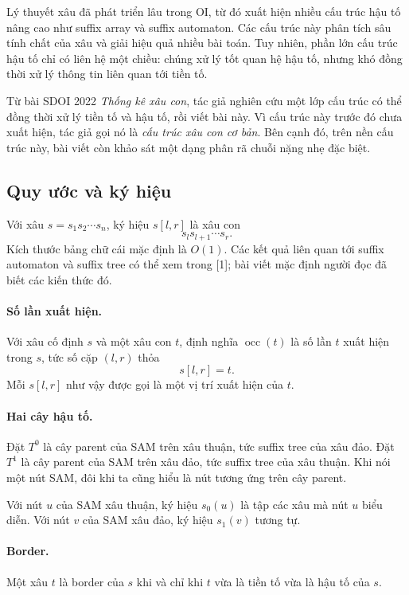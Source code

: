 \documentclass[11pt]{article}
\begin{document}
Lý thuyết xâu đã phát triển lâu trong OI, từ đó xuất hiện nhiều cấu trúc hậu
tố nâng cao như suffix array và suffix automaton. Các cấu trúc này phân tích
sâu tính chất của xâu và giải hiệu quả nhiều bài toán. Tuy nhiên, phần lớn cấu
trúc hậu tố chỉ có liên hệ một chiều: chúng xử lý tốt quan hệ hậu tố, nhưng
khó đồng thời xử lý thông tin liên quan tới tiền tố.

Từ bài SDOI 2022 \emph{Thống kê xâu con}, tác giả nghiên cứu một lớp cấu trúc
có thể đồng thời xử lý tiền tố và hậu tố, rồi viết bài này. Vì cấu trúc này
trước đó chưa xuất hiện, tác giả gọi nó là \emph{cấu trúc xâu con cơ bản}. Bên
cạnh đó, trên nền cấu trúc này, bài viết còn khảo sát một dạng phân rã chuỗi
nặng nhẹ đặc biệt.

\subsection{Quy ước và ký hiệu}

Với xâu \(s=s_1s_2\cdots s_n\), ký hiệu \(s[l,r]\) là xâu con
\[
  s_ls_{l+1}\cdots s_r.
\]
Kích thước bảng chữ cái mặc định là \(O(1)\). Các kết quả liên quan tới suffix
automaton và suffix tree có thể xem trong [1]; bài viết mặc định người đọc đã
biết các kiến thức đó.

\paragraph{Số lần xuất hiện.}
Với xâu cố định \(s\) và một xâu con \(t\), định nghĩa \(\operatorname{occ}(t)\)
là số lần \(t\) xuất hiện trong \(s\), tức số cặp \((l,r)\) thỏa
\[
  s[l,r]=t.
\]
Mỗi \(s[l,r]\) như vậy được gọi là một vị trí xuất hiện của \(t\).

\paragraph{Hai cây hậu tố.}
Đặt \(T^0\) là cây parent của SAM trên xâu thuận, tức suffix tree của xâu đảo.
Đặt \(T^1\) là cây parent của SAM trên xâu đảo, tức suffix tree của xâu thuận.
Khi nói một nút SAM, đôi khi ta cũng hiểu là nút tương ứng trên cây parent.

Với nút \(u\) của SAM xâu thuận, ký hiệu \(s_0(u)\) là tập các xâu mà nút
\(u\) biểu diễn. Với nút \(v\) của SAM xâu đảo, ký hiệu \(s_1(v)\) tương tự.

\paragraph{Border.}
Một xâu \(t\) là border của \(s\) khi và chỉ khi \(t\) vừa là tiền tố vừa là
hậu tố của \(s\).
\end{document}
